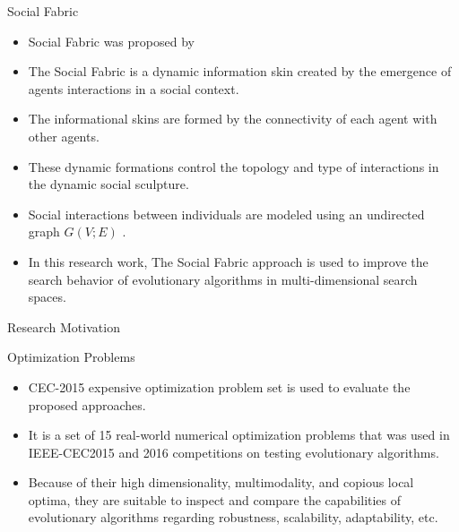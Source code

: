 \documentclass[table]{beamer}
\begin{document}
	\begin{frame}{Social Fabric}
		\begin{block}{}
			\begin{itemize}
				\justifying
				\item Social Fabric was proposed by \cite{R:1}
				\item The Social Fabric is a dynamic information skin created by the emergence of agents interactions in a social context.
				\item The informational skins are formed by the connectivity of each agent with other agents.
				\item These dynamic formations control the topology and type of interactions in the dynamic social sculpture. \cite{reynolds2008computing}
				\item Social interactions between individuals are modeled using an undirected graph $G(V;E)$ \cite{sterling2004aggregation}.
				\item In this research work, The Social Fabric approach is used to improve the search behavior of evolutionary algorithms in multi-dimensional search spaces.
			\end{itemize}
		\end{block}
	\end{frame}
	
	\begin{frame}{Research Motivation}
		\begin{block}{Optimization Problems}
			\begin{itemize}
				\justifying
				\item CEC-2015 expensive optimization problem set is used to evaluate the proposed approaches. \cite{chen2014problem}
				\item It is a set of 15 real-world numerical optimization problems that was used in IEEE-CEC2015 and 2016 competitions on testing evolutionary algorithms.
				\item Because of their high dimensionality, multimodality, and copious local optima, they are suitable to inspect and compare the capabilities of evolutionary algorithms regarding robustness, scalability, adaptability, etc.
			\end{itemize}
		\end{block}
	\end{frame}
	
\end{document}
